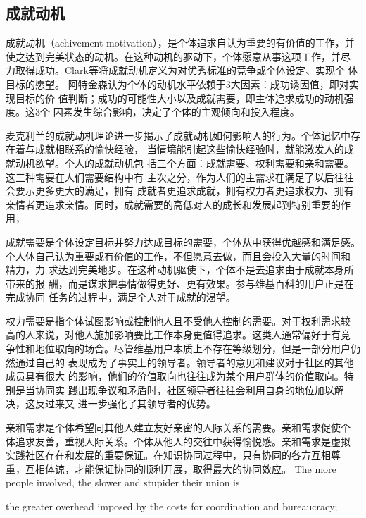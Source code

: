 \subsection{成就动机}
\label{sec:achievement}
成就动机（achivement motivation），是个体追求自认为重要的有价值的工作，并
使之达到完美状态的动机。在这种动机的驱动下，个体愿意从事这项工作，并尽
力取得成功。Clark等将成就动机定义为对优秀标准的竞争或个体设定、实现个
体目标的愿望。
阿特金森认为个体的动机水平依赖于3大因素：成功诱因值，即对实现目标的价
值判断；成功的可能性大小以及成就需要，即主体追求成功的动机强度。这3个
因素发生综合影响，决定了个体的主观倾向和投入程度。

麦克利兰的成就动机理论进一步揭示了成就动机如何影响人的行为。个体记忆中存在着与成就相联系的愉快经验，
当情境能引起这些愉快经验时，就能激发人的成就动机欲望。个人的成就动机包
括三个方面：成就需要、权利需要和亲和需要。这三种需要在人们需要结构中有
主次之分，作为人们的主需求在满足了以后往往会要示更多更大的满足，拥有
成就者更追求成就，拥有权力者更追求权力、拥有亲情者更追求亲情。同时，成就需要的高低对人的成长和发展起到特别重要的作用，

成就需要是个体设定目标并努力达成目标的需要，个体从中获得优越感和满足感。
个人体自己认为重要或有价值的工作，不但愿意去做，而且会投入大量的时间和
精力，力
求达到完美地步。在这种动机驱使下，个体不是去追求由于成就本身所带来的报
酬，而是谋求把事情做得更好、更有效果。参与维基百科的用户正是在完成协同
任务的过程中，满足个人对于成就的渴望。

权力需要是指个体试图影响或控制他人且不受他人控制的需要。对于权利需求较
高的人来说，对他人施加影响要比工作本身更值得追求。这类人通常偏好于有竞
争性和地位取向的场合。尽管维基用户本质上不存在等级划分，但是一部分用户仍然通过自己的
表现成为了事实上的领导者。领导者的意见和建议对于社区的其他成员具有很大
的影响，他们的价值取向也往往成为某个用户群体的价值取向。特别是当协同实
践出现争议和矛盾时，社区领导者往往会利用自身的地位加以解决，这反过来又
进一步强化了其领导者的优势。

亲和需求是个体希望同其他人建立友好亲密的人际关系的需要。亲和需求促使个
体追求友善，重视人际关系。个体从他人的交往中获得愉悦感。亲和需求是虚拟
实践社区存在和发展的重要保证。在知识协同过程中，只有协同的各方互相尊
重，互相体谅，才能保证协同的顺利开展，取得最大的协同效应。
The more
people involved, the slower and stupider their union is

the greater overhead imposed by the costs for coordination and
bureaucracy;
